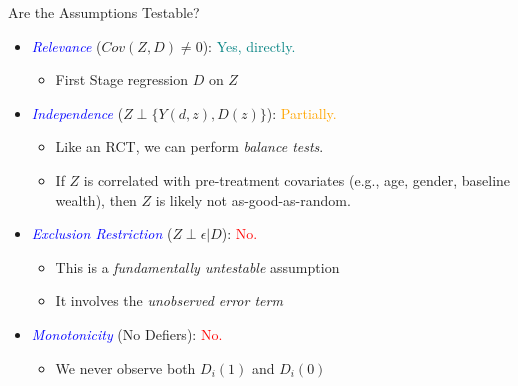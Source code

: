 \documentclass[11pt, handout]{beamer}
\begin{document}
\begin{frame}{Are the Assumptions Testable?}
    \begin{itemize}[<+->]
        \item \textcolor{blue}{\textit{Relevance}} ($Cov(Z, D) \neq 0$): \textcolor{teal}{Yes, directly.}
        \begin{itemize}
            \item First Stage regression $D$ on $Z$
        \end{itemize}
        \vspace{0.8em}
        \item \textcolor{blue}{\textit{Independence}} ($Z \perp \{Y(d, z), D(z)\}$): \textcolor{orange}{Partially.}
        \begin{itemize}
            \item Like an RCT, we can perform \textit{balance tests}.
            \item If $Z$ is correlated with pre-treatment covariates (e.g., age, gender, baseline wealth), then $Z$ is likely not as-good-as-random.
        \end{itemize}
        \vspace{0.8em}
        \item \textcolor{blue}{\textit{Exclusion Restriction}} ($Z \perp \epsilon | D$): \textcolor{red}{No.}
        \begin{itemize}
            \item This is a \textit{fundamentally untestable} assumption
            \item It involves the \textit{unobserved error term}
        \end{itemize}
        \vspace{0.8em}
        \item \textcolor{blue}{\textit{Monotonicity}} (No Defiers): \textcolor{red}{No.}
        \begin{itemize}
            \item We never observe both $D_i(1)$ and $D_i(0)$
        \end{itemize}
    \end{itemize}
\end{frame}
\end{document}
